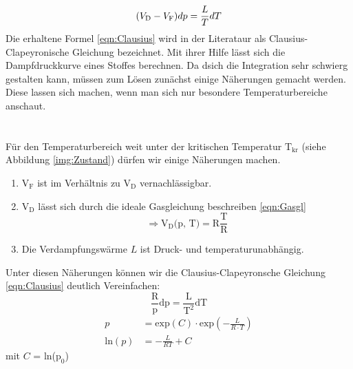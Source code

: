 \begin{equation}
    (V_\text{D}-V_\text{F})dp =\frac{L}{T}dT\\
    \label{eqn:Clausius}
\end{equation}
Die erhaltene Formel \eqref{eqn:Clausius} wird in der Literataur als Clausius-Clapeyronische Gleichung bezeichnet. Mit ihrer Hilfe 
lässt sich die Dampfdruckkurve eines Stoffes berechnen. Da dsich die Integration sehr schwierg gestalten kann, müssen zum Lösen
zunächst einige Näherungen gemacht werden. Diese lassen sich machen, wenn man sich nur besondere Temperaturbereiche anschaut.
\\
\\
\\
Für den Temperaturbereich weit unter der kritischen Temperatur $\text{T}_\text{kr}$ (siehe Abbildung \ref{img:Zustand}) dürfen wir einige Näherungen machen.
\begin{enumerate}
    \item $\text{V}_\text{F}$ ist im Verhältnis zu $\text{V}_\text{D}$ vernachlässigbar.
    \item $\text{V}_\text{D}$ lässt sich durch die ideale Gasgleichung beschreiben \eqref{eqn:Gasgl}\\
            \begin{equation}
                \Rightarrow \text{V}_\text{D} \text{(p, T)} = \text{R}\frac{\text{T}}{\text{R}}
            \end{equation}
    \item Die Verdampfungswärme $L$ ist Druck- und temperaturunabhängig.
\end{enumerate}
Unter diesen Näherungen können wir die Clausius-Clapeyronsche Gleichung \eqref{eqn:Clausius} deutlich Vereinfachen:
\begin{equation}
    \frac{\text{R}}{\text{p}}\text{dp} = \frac{\text{L}}{\text{T}^2}\text{dT}
\end{equation}
\begin{align}
p &= \text{exp}(C)\cdot \text{exp}\left(-\frac{L}{R \cdot T}\right)\\
\text{ln}(p)&= -\frac{L}{RT} + C
\end{align}
mit $C$ = ln($\text{p}_0$)
